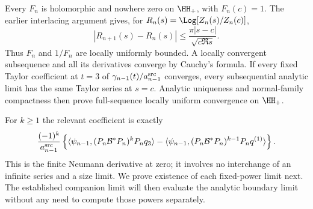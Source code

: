 Every $F_n$ is holomorphic and nowhere zero on $\HH_+$, with
$F_n(c)=1$. The earlier interlacing argument gives, for
$R_n(s)=\Log[Z_n(s)/Z_n(c)]$,
\[
 |R_{n+1}(s)-R_n(s)|\le
             \frac{\pi|s-c|}{\sqrt{c\Re s}}.
\]
Thus $F_n$ and $1/F_n$ are locally uniformly bounded. A locally
convergent subsequence and all its derivatives converge by Cauchy's
formula. If every fixed Taylor coefficient at $t=3$ of
$\gamma_{n-1}(t)/a_{n-1}^{\rm src}$ converges, every subsequential
analytic limit has the same Taylor series at $s=c$. Analytic
uniqueness and normal-family compactness then prove full-sequence
locally uniform convergence on $\HH_+$.

For $k\ge1$ the relevant coefficient is exactly
\begin{equation}\label{Taylorcoef}
 \frac{(-1)^k}{a_{n-1}^{\rm src}}\left\{
 \langle\psi_{n-1},(P_n\mathcal B^*P_n)^kP_nq_3\rangle
 -\langle\psi_{n-1},(P_n\mathcal B^*P_n)^{k-1}P_nq^{(1)}\rangle
 \right\}.
\end{equation}
This is the finite Neumann derivative at zero; it involves no
interchange of an infinite series and a size limit. We prove
existence of each fixed-power limit next. The established companion
limit will then evaluate the analytic boundary limit without any
need to compute those powers separately.
